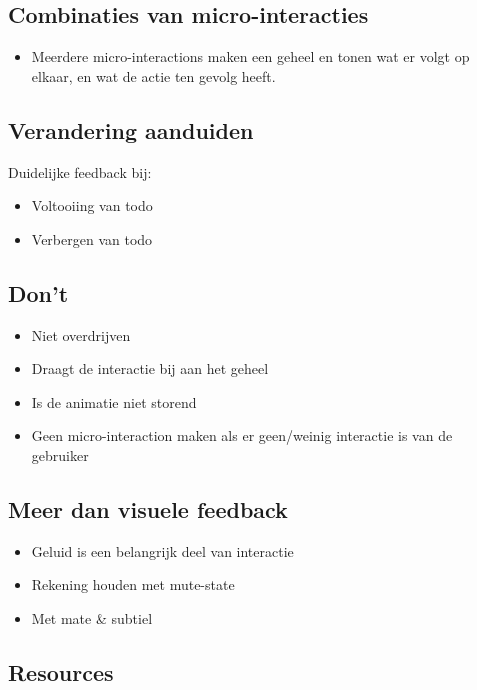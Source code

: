 \documentclass{article}
\begin{document}
\subsection{Combinaties van micro-interacties}

\begin{itemize}
    \item Meerdere micro-interactions maken een geheel en tonen wat er volgt op elkaar, en wat de actie ten gevolg heeft.
\end{itemize}

\subsection{Verandering aanduiden}

Duidelijke feedback bij:

\begin{itemize}
    \item Voltooiing van todo
    \item Verbergen van todo
\end{itemize}

\subsection{Don't}

\begin{itemize}
    \item Niet overdrijven
    \item Draagt de interactie bij aan het geheel
    \item Is de animatie niet storend
    \item Geen micro-interaction maken als er geen/weinig interactie is van de gebruiker
\end{itemize}

\subsection{Meer dan visuele feedback}

\begin{itemize}
    \item Geluid is een belangrijk deel van interactie
    \item Rekening houden met mute-state
    \item Met mate \& subtiel
\end{itemize}

\subsection{Resources}
\end{document}
